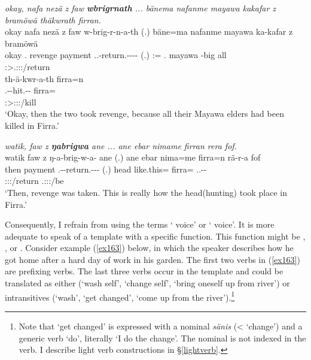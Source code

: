 \begin{exe}
	\ex
	\begin{xlist}
	\ex	\emph{okay, nafa nezä z faw \textbf{wbrigrnath} ... bänema nafanme mayawa kakafar z bramöwä thäkwrath firran.}\\
	\glll okay nafa nezä z faw w-brig-r-n-a-th (.) bäne=ma nafanme mayawa ka-kafar z bramöwä\\
	okay \Tnsg.\Erg{} revenge \Iam{} payment \Tsg.\F.\Alph-return.\Ext-\Lk-\Du-\Pst-\Stnsg{} (.) \Dem:\Med=\Char{} \Tnsg.\Poss{} mayawa \Redup-big \Iam{} all\\
	{} {} {} {} {} \footnotesize{\Stdu:\Sbj>\Tsg.\F:\Obj:\Pst:\Ipfv/return} {} {} {} {} {} {} {}\\
	\sn
	\glll th-ä-kwr-a-th firra=n\\
	\Stnsg.\Gam-\Vc\textbar\Ndu-hit.\Rs-\Pst-\Stnsg{} firra=\Loc\\
	\footnotesize{\Stpl:\Sbj>\Stpl:\Obj:\Pst:\Pfv/kill} {}\\
	\trans `Okay, then the two took revenge, because all their Mayawa elders had been killed in Firra.'
	\label{ex159}

	\ex	\emph{watik, faw z \textbf{ŋabrigwa} ane ... ane ebar nimame firran rera fof.}\\
	\glll watik faw z ŋ-a-brig-w-a-\Zero{} ane (.) ane ebar nima=me firra=n rä-r-a fof\\
	then payment \Iam{} \M.\Alph-\Vc-return.\Ext-\Ndu-\Pst-\Stsg{} \Dem{} (.) \Dem{} head like.this=\Ins{} firra=\Loc{} \Tsg.\F.\Cop-\Lk-\Pst{} \Emph\\
	{} {} {} \footnotesize{\Stsg:\Sbj:\Pst:\Ipfv/return} {} {} {} {} {} {} \footnotesize{\Tsg.\F:\Sbj:\Pst:\Ipfv/be} {}\\
	\trans `Then, revenge was taken. This is really how the head(hunting) took place in Firra.'
	\label{ex329}
	\end{xlist}
\end{exe}

Consequently, I refrain from using the terms ` voice' or ` voice'. It is more adequate to speak of a  template with a specific function. This function might be , ,  or . Consider example (\ref{ex163}) below, in which the speaker describes how he got home after a hard day of work in his garden. The first two verbs in (\ref{ex163}) are prefixing verbs. The last three verbs occur in the  template and could be translated as either  (`wash self', `change self', `bring oneself up from river') or intransitives (`wash', `get changed', `come up from the river').\footnote{Note that `get changed' is expressed with a nominal \emph{sänis} (<  `change') and a generic verb `do', literally `I do the change'. The nominal is not indexed in the verb. I describe light verb constructions in \S\ref{lightverb}.}

